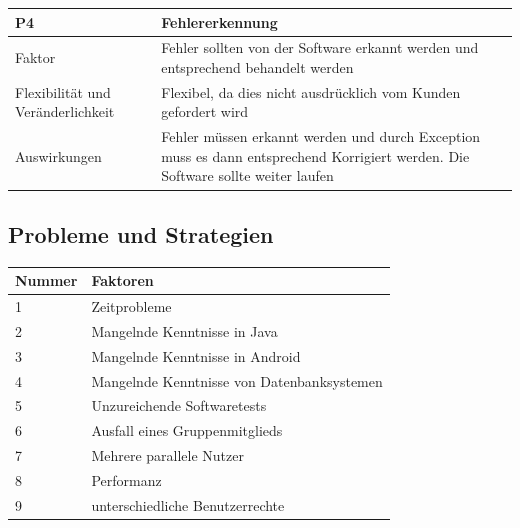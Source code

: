 \documentclass[fontsize=12pt,paper=a4,twoside]{scrartcl}
\begin{document}
\begin{table}[H]
\begin{tabular}{|p{3cm}|p{12cm}|}\hline
P4 &  Fehlererkennung \\ \hline
Faktor & Fehler sollten von der Software erkannt werden und entsprechend behandelt werden\\ \hline
Flexibilität und Veränderlichkeit & Flexibel, da dies nicht ausdrücklich vom Kunden gefordert wird\\ \hline
Auswirkungen & Fehler müssen erkannt werden und durch Exception muss es dann entsprechend Korrigiert werden. Die Software sollte weiter laufen  \\ \hline
\end{tabular}
\end{table}


\subsection{Probleme und Strategien}
\label{sec:strategien}

\begin{table}[H]
\centering
\begin{tabular}{|l|l|}\hline
Nummer & Faktoren\\ \hline
1 & Zeitprobleme\\ \hline
2 & Mangelnde Kenntnisse in Java\\ \hline
3 & Mangelnde Kenntnisse in Android\\ \hline
4 & Mangelnde Kenntnisse von Datenbanksystemen\\ \hline
5 & Unzureichende Softwaretests\\ \hline
6 & Ausfall eines Gruppenmitglieds\\ \hline
7 & Mehrere parallele Nutzer\\ \hline
8 & Performanz\\ \hline
9 & unterschiedliche Benutzerrechte\\ \hline
\end{tabular}
\end{table}
\end{document}
